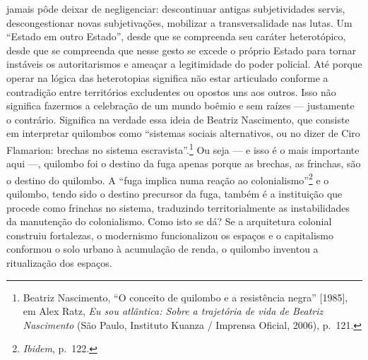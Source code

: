jamais pôde deixar de negligenciar: descontinuar antigas subjetividades
servis, descongestionar novas subjetivações, mobilizar a
transversalidade nas lutas. Um ``Estado em outro Estado'', desde que se
compreenda seu caráter heterotópico, desde que se compreenda que nesse
gesto se excede o próprio Estado para tornar instáveis os autoritarismos
e ameaçar a legitimidade do poder policial. Até porque operar na lógica
das heterotopias significa não estar articulado conforme a contradição
entre territórios excludentes ou opostos uns aos outros. Isso não
significa fazermos a celebração de um mundo boêmio e sem raízes ---
justamente o contrário. Significa na verdade essa ideia de Beatriz
Nascimento, que consiste em interpretar quilombos como ``sistemas
sociais alternativos, ou no dizer de Ciro Flamarion: brechas no sistema
escravista''.\footnote{Beatriz Nascimento, ``O conceito de quilombo e a
  resistência negra'' {[}1985{]}, em Alex Ratz, \textit{Eu sou atlântica:
  Sobre a trajetória de vida de Beatriz Nascimento} (São Paulo,
  Instituto Kuanza / Imprensa Oficial, 2006), p.~121.} Ou seja --- e isso
é o mais importante aqui ---, quilombo foi o destino da fuga apenas
porque as brechas, as frinchas, são o destino do quilombo. A ``fuga
implica numa reação ao colonialismo''\footnote{\textit{Ibidem}, p.~122.} e
o quilombo, tendo sido o destino precursor da fuga, também é a
instituição que procede como frinchas no sistema, traduzindo
territorialmente as instabilidades da manutenção do colonialismo. Como
isto se dá? Se a arquitetura colonial construiu fortalezas, o modernismo
funcionalizou os espaços e o capitalismo conformou o solo urbano à
acumulação de renda, o quilombo inventou a ritualização dos espaços.

